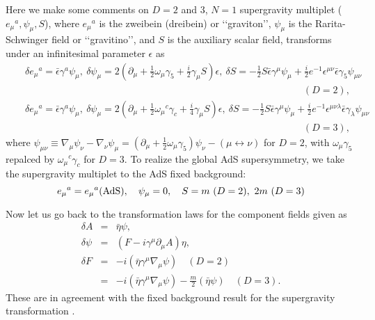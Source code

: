 \documentclass[a4paper,12pt]{article}
\def\baeta{\bar{\eta}}
\begin{document}
Here we make some comments on $D=2$ and $3$, $N=1$ supergravity 
multiplet (${e_\mu}^a, \psi_\mu,S$), where ${e_\mu}^a$ is the 
zweibein (dreibein) or \lq\lq graviton\rq\rq,
$\psi_\mu$ is the Rarita-Schwinger field or \lq\lq gravitino\rq\rq, and
$S$ is the auxiliary scalar field, transforms under an infinitesimal
parameter $\epsilon$ as \cite{2DSG}
\begin{eqnarray}
&&\delta{e_\mu}^a={\bar\epsilon}\gamma^a\psi_\mu,\
\delta\psi_\mu=2(\partial_\mu+\frac{1}{2}\omega_\mu\gamma_5+\frac{i}{2}
\gamma_\mu S)\epsilon,\
\delta S=-\frac{1}{2}S{\bar\epsilon}\gamma^\mu\psi_\mu
+\frac{i}{2}e^{-1}\epsilon^{\mu\nu}{\bar\epsilon}\gamma_5\psi_{\mu\nu}
\nonumber\\
&&\hspace{12cm}(D=2),\\
&&\delta{e_\mu}^a={\bar\epsilon}\gamma^a\psi_\mu,\
\delta\psi_\mu=2(\partial_\mu+\frac{1}{2}{\omega_\mu}^c\gamma_c+
\frac{i}{4}\gamma_\mu S)\epsilon,\
\delta S=-\frac{1}{2}S{\bar\epsilon}\gamma^\mu\psi_\mu
+\frac{i}{2}e^{-1}\epsilon^{\mu\nu\lambda}{\bar\epsilon}\gamma_\lambda
\psi_{\mu\nu}
\nonumber\\
&&\hspace{12cm}(D=3),
\end{eqnarray}
where 
$\displaystyle{\psi_{\mu\nu}\equiv \nabla_\mu\psi_\nu-\nabla_\nu\psi_\mu
=(\partial_\mu+\frac{1}{2}\omega_\mu\gamma_5)\psi_\nu-
(\mu\leftrightarrow\nu)}$ for $D=2$, with 
$\displaystyle{\omega_\mu\gamma_5}$ repalced by $\displaystyle{
{\omega_\mu}^c\gamma_c}$ for $D=3$.
To realize the global AdS supersymmetry, we take the supergravity
multiplet to the AdS fixed background: \cite{ST,IO} 
\begin{equation}
{e_\mu}^a={e_\mu}^a({\rm AdS}),\quad \psi_\mu=0,\quad
 S=m\ (D=2),\ 2m \ (D=3)\label{adsbgeq}
\end{equation}

Now let us go back to
the transformation laws for the component fields given as
\begin{eqnarray}
 \delta A &=& \baeta\psi , \nonumber \\
 \delta\psi &=& (F-i\gamma^{\mu}\partial_{\mu}A)\eta ,\nonumber \\
 \delta F &=& -i(\baeta\gamma^{\mu}\nabla_{\mu}\psi)
	\quad (D=2) \\
          &=& -i(\baeta\gamma^{\mu}\nabla_{\mu}\psi)
	 -\frac{m}{2}(\baeta\psi)
	\quad (D=3). \nonumber
\end{eqnarray}
These are in agreement with the fixed background result
for the supergravity transformation \cite{2DSG}.
\end{document}
